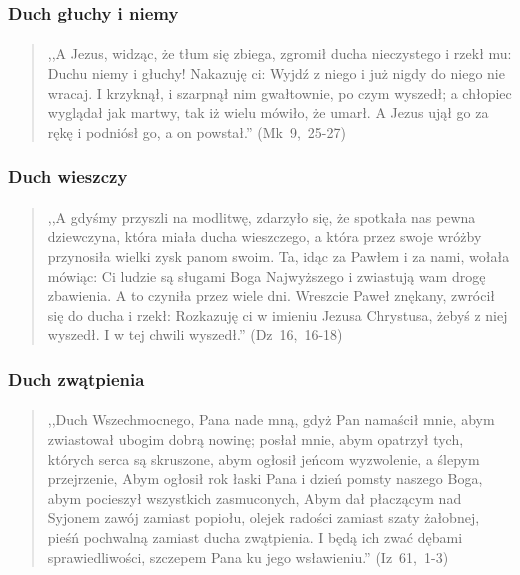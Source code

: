 \documentclass[10pt,a4paper,oneside]{article}
\begin{document}
\subsubsection{Duch głuchy i niemy}
\paragraph{}
\begin{quote}
,,A Jezus, widząc, że tłum się zbiega, zgromił ducha nieczystego i rzekł mu: Duchu niemy i głuchy! Nakazuję ci: Wyjdź z niego i już nigdy do niego nie wracaj. I krzyknął, i szarpnął nim gwałtownie, po czym wyszedł; a chłopiec wyglądał jak martwy, tak iż wielu mówiło, że umarł. A Jezus ujął go za rękę i podniósł go, a on powstał.'' \mbox{(Mk 9, 25-27)}
\end{quote}
\subsubsection{Duch wieszczy}
\paragraph{}
\begin{quote}
,,A gdyśmy przyszli na modlitwę, zdarzyło się, że spotkała nas pewna dziewczyna, która miała ducha wieszczego, a która przez swoje wróżby przynosiła wielki zysk panom swoim. Ta, idąc za Pawłem i za nami, wołała mówiąc: Ci ludzie są sługami Boga Najwyższego i zwiastują wam drogę zbawienia. A to czyniła przez wiele dni. Wreszcie Paweł znękany, zwrócił się do ducha i rzekł: Rozkazuję ci w imieniu Jezusa Chrystusa, żebyś z niej wyszedł. I w tej chwili wyszedł.'' \mbox{(Dz 16, 16-18)}
\end{quote}
\subsubsection{Duch zwątpienia}
\paragraph{}
\begin{quote}
,,Duch Wszechmocnego, Pana nade mną, gdyż Pan namaścił mnie, abym zwiastował ubogim dobrą nowinę; posłał mnie, abym opatrzył tych, których serca są skruszone, abym ogłosił jeńcom wyzwolenie, a ślepym przejrzenie, Abym ogłosił rok łaski Pana i dzień pomsty naszego Boga, abym pocieszył wszystkich zasmuconych, Abym dał płaczącym nad Syjonem zawój zamiast popiołu, olejek radości zamiast szaty żałobnej, pieśń pochwalną zamiast ducha zwątpienia. I będą ich zwać dębami sprawiedliwości, szczepem Pana ku jego wsławieniu.'' \mbox{(Iz 61, 1-3)}
\end{quote}
\end{document}
